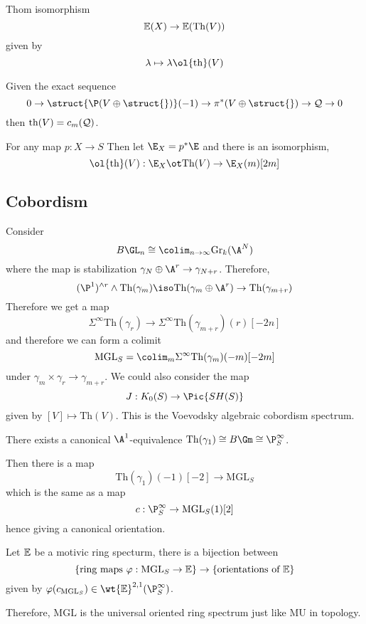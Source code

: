 \documentclass{article}
\newcommand{\cQ}{\mathcal{Q}}
\newcommand{\Gr}{\mathrm{Gr}}
\newcommand{\MGL}{\mathrm{MGL}}
\newcommand{\Th}{\mathrm{Th}}
\begin{document}
Thom isomorphism
\[ \EE(X) \to \EE(\Th(V)) \]
given by
\[ \lambda \mapsto \lambda \ol{\th}(V) \]



\begin{rmk}
Given the exact sequence
\[ 0 \to \struct{\P(V \oplus \struct{})}(-1) \to \pi^* (V \oplus \struct{}) \to \cQ \to 0 \]
then $\th(V) = c_m(\cQ)$. 
\end{rmk}

For any map $p : X \to S$
Then let $\E_X = p^* \E$ and there is an isomorphism,
\[ \ol{\th}(V) : \E_X \ot \Th(V) \to \E_X(m)[2m] \]

\subsection{Cobordism}

Consider
\[ B\GL_n \cong \colim_{n \to \infty} \Gr_k(\A^N) \]
where the map is stabilization $\gamma_N \oplus \A^r \to \gamma_{N+r}$. Therefore,
\[ (\P^1)^{\wedge r} \wedge \Th(\gamma_m) \iso \Th(\gamma_m \oplus \A^r) \to \Th(\gamma_{m+r}) \]
Therefore we get a map
\[ \Sigma^\infty \Th(\gamma_r) \to \Sigma^\infty \Th(\gamma_{m+r})(r)[-2n] \]
and therefore we can form a colimit
\[ \MGL_S = \colim_m \Sigma^\infty \Th(\gamma_m)(-m)[-2m] \]
under $\gamma_{m} \times \gamma_{r} \to \gamma_{m + r}$. We could also consider the map
\[ J : K_0(S) \to \Pic{SH(S)} \]
given by $[V] \mapsto \Th(V)$. This is the Voevodsky algebraic cobordism spectrum. 

\begin{lemma}
There exists a canonical $\A^1$-equivalence $\Th(\gamma_1) \cong B \Gm \cong \P^\infty_S$. 
\end{lemma}


Then there is a map
\[ \Th(\gamma_1)(-1)[-2] \to \MGL_S \]
which is the same as a map
\[ c : \P^\infty_S \to \MGL_S(1)[2] \]
hence giving a canonical orientation. 

\begin{theorem}
Let $\mathbb{E}$ be a motivic ring specturm, there is a bijection between
\[ \{ \text{ring maps } \varphi : \MGL_S \to \EE \} \to \{ \text{orientations of } \EE \}  \]
given by $\varphi(c_{\MGL_S}) \in \wt{\EE}^{2,1}(\P^\infty_S)$. 
\end{theorem}

Therefore, $\MGL$ is the universal oriented ring spectrum just like $\mathrm{MU}$ in topology. 
\end{document}
